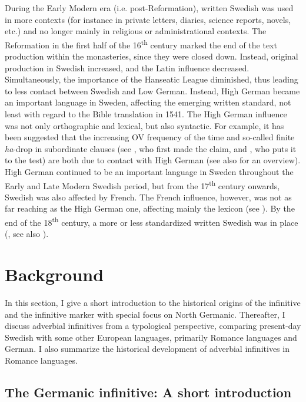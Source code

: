 \documentclass[output=paper]{langscibook}
\begin{document}
During the Early Modern era (i.e. post-Reformation), written Swedish was used in more contexts (for instance in private letters, diaries, science reports, novels, etc.) and no longer mainly in religious or administrational contexts. The Reformation in the first half of the 16\textsuperscript{th} century marked the end of the text production within the monasteries, since they were closed down. Instead, original production in Swedish increased, and the Latin influence decreased. Simultaneously, the importance of the Hanseatic League diminished, thus leading to less contact between Swedish and Low German. Instead, High German became an important language in Sweden, affecting the emerging written standard, not least with regard to the Bible translation in 1541. The High German influence was not only orthographic and lexical, but also syntactic. For example, it has been suggested that the increasing OV frequency of the time \citep{Petzell2011} and so-called finite \textit{ha}{}-drop in subordinate clauses (see \citealt{Johannisson1945}, who first made the claim, and \citealt{Backstrom2019}, who puts it to the test) are both due to contact with High German (see also \citealt{Braunmuller2005} for an overview). High German continued to be an important language in Sweden throughout the Early and Late Modern Swedish period, but from the 17\textsuperscript{th} century onwards, Swedish was also affected by French. The French influence, however, was not as far reaching as the High German one, affecting mainly the lexicon (see \citealt{Gellerstam2005}). By the end of the 18\textsuperscript{th} century, a more or less standardized written Swedish was in place (\citealt{Teleman2002}, see also ).


\section{Background}\label{sec:kalm:3}


In this section, I give a short introduction to the historical origins of the infinitive and the infinitive marker with special focus on North Germanic. Thereafter, I discuss adverbial infinitives from a typological perspective, comparing present-day Swedish with some other European languages, primarily Romance languages and German. I also summarize the historical development of adverbial infinitives in Romance languages. 


\subsection{The Germanic infinitive: A short introduction}\label{sec:kalm:3.1}
\end{document}
